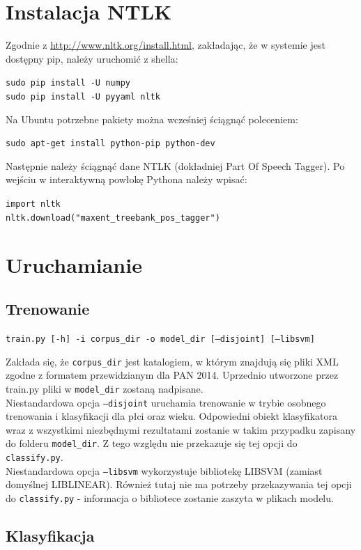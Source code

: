 \documentclass{article}
\begin{document}
\section{Instalacja NTLK}

Zgodnie z \href{http://www.nltk.org/install.html}{http://www.nltk.org/install.html}, zakładając, że w systemie jest dostępny pip, należy uruchomić z shella:

\texttt{sudo pip install -U numpy \\
sudo pip install -U pyyaml nltk}

Na Ubuntu potrzebne pakiety można wcześniej ściągnąć poleceniem:

\texttt{sudo apt-get install python-pip python-dev}

Następnie należy ściągnąć dane NTLK (dokładniej Part Of Speech Tagger). Po wejściu w interaktywną powłokę Pythona należy wpisać:

\texttt{import nltk \\
nltk.download("maxent\_treebank\_pos\_tagger")}


\section{Uruchamianie}

\subsection{Trenowanie}

\texttt{train.py [-h] -i corpus\_dir -o model\_dir [--disjoint] [--libsvm]}

Zakłada się, że \texttt{corpus\_dir} jest katalogiem, w którym znajdują się pliki XML zgodne z formatem przewidzianym dla PAN 2014. Uprzednio utworzone przez train.py pliki w \texttt{model\_dir} zostaną nadpisane. \\
Niestandardowa opcja \texttt{--disjoint} uruchamia trenowanie w trybie osobnego trenowania i klasyfikacji dla płci oraz wieku. Odpowiedni obiekt klasyfikatora wraz z wszystkimi niezbędnymi rezultatami zostanie w takim przypadku zapisany do folderu \texttt{model\_dir}. Z tego względu nie przekazuje się tej opcji do \texttt{classify.py}. \\
Niestandardowa opcja \texttt{--libsvm} wykorzystuje bibliotekę LIBSVM (zamiast domyślnej LIBLINEAR). Również tutaj nie ma potrzeby przekazywania tej opcji do \texttt{classify.py} - informacja o bibliotece zostanie zaszyta w plikach modelu.

\subsection{Klasyfikacja}
\end{document}
